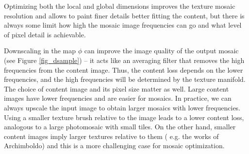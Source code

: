 \documentclass{article}
\begin{document}
Optimizing both the local and global dimensions improves the texture mosaic resolution and allows to paint finer details better fitting the content, but there is always some limit how high the mosaic image frequencies can go and what level of pixel detail is achievable.


Downscaling in the map $\phi$ can improve the image quality of the output mosaic (see Figure \ref{fig_dsample}) -- it acts like an averaging filter that removes the high frequencies from the content image. Thus, the content loss depends on the lower frequencies, and the high frequencies will be determined by the texture manifold.
The choice of content image and its pixel size matter as well. Large content images have lower frequencies and are easier for mosaics.  
In practice, we can always upscale the input image to obtain larger mosaics with lower frequencies. Using a smaller texture brush relative to the image leads to a lower content loss, analogous to a large photomosaic with small tiles. 
On the other hand, smaller content images imply larger textures relative to them ( e.g. the works of Archimboldo) and this is a more challenging case for mosaic optimization. 



\end{document}
